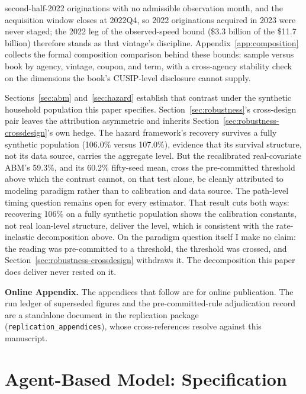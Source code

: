 \documentclass[12pt]{article}
\begin{document}
second-half-2022 originations with no admissible observation month, and the acquisition window closes at 2022Q4, so 2022 originations acquired in 2023 were never staged; the 2022 leg of the observed-speed bound (\$3.3 billion of the \$11.7 billion) therefore stands as that vintage's discipline. Appendix~\ref{app:composition} collects the formal composition comparison behind these bounds: sample versus book by agency, vintage, coupon, and term, with a cross-agency stability check on the dimensions the book's CUSIP-level disclosure cannot supply.

Sections~\ref{sec:abm} and~\ref{sec:hazard} establish that contrast under the synthetic household population this paper specifies. Section~\ref{sec:robustness}'s cross-design pair leaves the attribution asymmetric and inherits Section~\ref{sec:robustness-crossdesign}'s own hedge. The hazard framework's recovery survives a fully synthetic population (106.0\% versus 107.0\%), evidence that its survival structure, not its data source, carries the aggregate level. But the recalibrated real-covariate ABM's 59.3\%, and its 60.2\% fifty-seed mean, cross the pre-committed threshold above which the contrast cannot, on that test alone, be cleanly attributed to modeling paradigm rather than to calibration and data source. The path-level timing question remains open for every estimator. That result cuts both ways: recovering 106\% on a fully synthetic population shows the calibration constants, not real loan-level structure, deliver the level, which is consistent with the rate-inelastic decomposition above. On the paradigm question itself I make no claim: the reading was pre-committed to a threshold, the threshold was crossed, and Section~\ref{sec:robustness-crossdesign} withdraws it. The decomposition this paper does deliver never rested on it.

\clearpage



\clearpage
\appendix

\noindent\textbf{Online Appendix.} The appendices that follow are for online publication. The run ledger of superseded figures and the pre-committed-rule adjudication record are a standalone document in the replication package (\texttt{replication\_appendices}), whose cross-references resolve against this manuscript.

\section{Agent-Based Model: Specification}\label{sec:method-abm}
\end{document}
